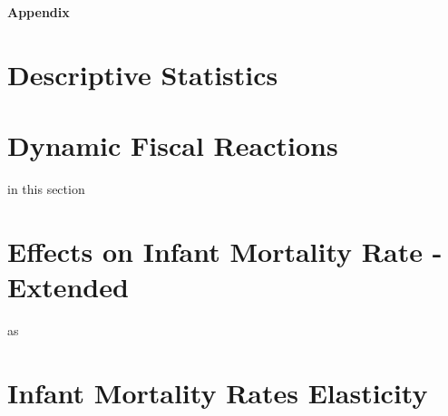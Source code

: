
\LARGE{\textbf{Appendix}}





\section{Descriptive Statistics}\label{app:stats}







\section{Dynamic Fiscal Reactions}

in this section




\section{Effects on Infant Mortality Rate - Extended}\label{app:imr}

as



\section{Infant Mortality Rates Elasticity}\label{app:elasticity}

